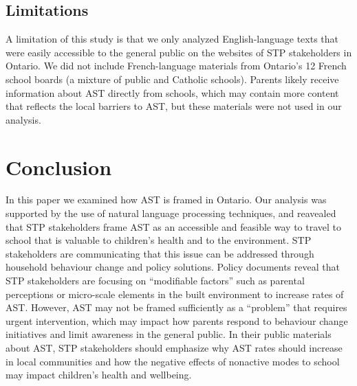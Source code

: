 \documentclass[preprint, 3p,
authoryear]{elsarticle} %
\begin{document}
\hypertarget{limitations}{%
\subsection{Limitations}\label{limitations}}

A limitation of this study is that we only analyzed English-language
texts that were easily accessible to the general public on the websites
of STP stakeholders in Ontario. We did not include French-language
materials from Ontario's 12 French school boards (a mixture of public
and Catholic schools). Parents likely receive information about AST
directly from schools, which may contain more content that reflects the
local barriers to AST, but these materials were not used in our
analysis.

\hypertarget{conclusion}{%
\section{Conclusion}\label{conclusion}}

In this paper we examined how AST is framed in Ontario. Our analysis was
supported by the use of natural language processing techniques, and
reavealed that STP stakeholders frame AST as an accessible and feasible
way to travel to school that is valuable to children's health and to the
environment. STP stakeholders are communicating that this issue can be
addressed through household behaviour change and policy solutions.
Policy documents reveal that STP stakeholders are focusing on
``modifiable factors'' such as parental perceptions or micro-scale
elements in the built environment to increase rates of AST. However, AST
may not be framed sufficiently as a ``problem'' that requires urgent
intervention, which may impact how parents respond to behaviour change
initiatives and limit awareness in the general public. In their public
materials about AST, STP stakeholders should emphasize why AST rates
should increase in local communities and how the negative effects of
nonactive modes to school may impact children's health and wellbeing.

\renewcommand\refname{References}

\end{document}
